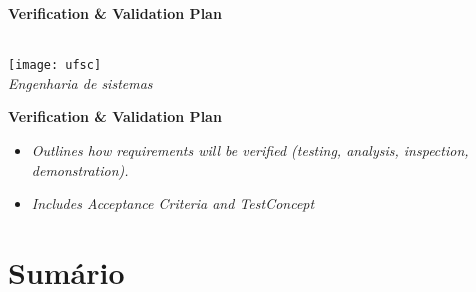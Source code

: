 \documentclass[journal]{IEEEtran}
\begin{document}
\begin{titlepage}
    \centering
    \vspace*{3cm}
    {\Huge\bfseries Verification \& Validation Plan \\[1.5em]}

    {\large\textit{}}\\[6em]
    \texttt{[image: ufsc]}\\[2em]
    {\Large \textit{Engenharia de sistemas}}
    \vfill
\end{titlepage}

\newpage
\thispagestyle{empty}
\begin{center}
    \Large\textbf{Verification \& Validation Plan}\\[2em]
    \large
    \begin{itemize}
        \item \textit{Outlines how requirements will be verified
        (testing, analysis, inspection,
        demonstration).}
        \item \textit{Includes Acceptance Criteria and TestConcept\\[4em]}
    \end{itemize}

\end{center}

\newpage
\section*{Sumário}
\renewcommand{\contentsname}{}
\end{document}
